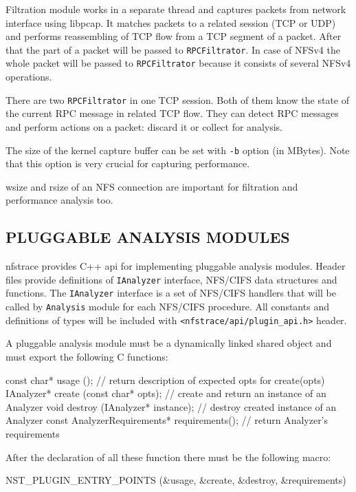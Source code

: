 \documentclass{article}
\newcommand{\code}[1]{\texttt{#1}}
\begin{document}
Filtration module works in a separate thread and captures packets from network
interface using libpcap. It matches packets to a related session (TCP or UDP)
and performs reassembling of TCP flow from a TCP segment of a packet. After
that the part of a packet will be passed to \code{RPCFiltrator}. In case of NFSv4 the
whole packet will be passed to \code{RPCFiltrator} because it consists of several
NFSv4 operations.  

There are two \code{RPCFiltrator} in one TCP session. Both of them
know the state of the current RPC message in related TCP flow. They can detect
RPC messages and perform actions on a packet: discard it or collect for
analysis.

The size of the kernel capture buffer can be set with \code{-b} option (in
MBytes).  Note that this option is very crucial for capturing performance.

\gls{wsize} and \gls{rsize} of an \gls{NFS} connection are important for
filtration and performance analysis too.

\subsection{PLUGGABLE ANALYSIS MODULES}

nfstrace provides C++ api for implementing pluggable analysis modules. Header
files provide definitions of \code{IAnalyzer} interface, NFS/CIFS data structures and
functions. The \code{IAnalyzer} interface is a set of NFS/CIFS handlers that will be
called by \code{Analysis} module for each NFS/CIFS procedure. All constants and
definitions of types will be included with \code{<nfstrace/api/plugin\_api.h>} header.

A pluggable analysis module must be a dynamically linked shared object and must
export the following C functions:

\begin{CodeListing}
const char* usage (); // return description of expected opts for create(opts)
IAnalyzer* create (const char* opts); // create and return an instance of an Analyzer 
void destroy (IAnalyzer* instance); // destroy created instance of an Analyzer 
const AnalyzerRequirements* requirements(); // return Analyzer's requirements 
\end{CodeListing}
After the declaration of all these function there must be the following macro:
\begin{CodeListing}
NST_PLUGIN_ENTRY_POINTS (&usage, &create, &destroy, &requirements)
\end{CodeListing}
\end{document}
